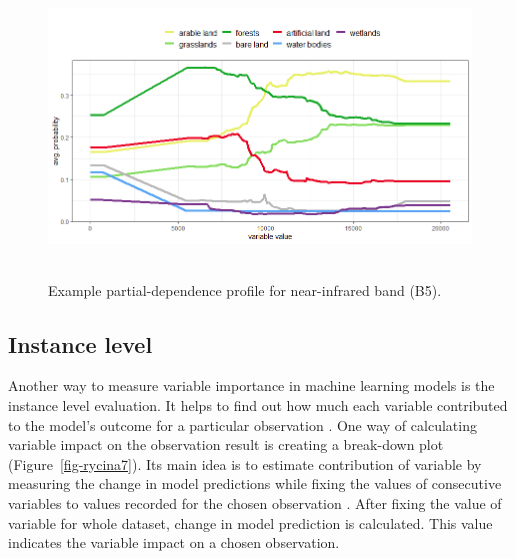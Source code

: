 \documentclass{amuthesis}
\begin{document}
\begin{figure}[H]

{\centering \includegraphics[width=5.625in,height=3.125in]{./figures/profB5.png}

}

\caption{\label{fig-rycina6}Example partial-dependence profile for
near-infrared band (B5).}

\end{figure}

\hypertarget{sec-importance-instance}{%
\subsection{Instance level}\label{sec-importance-instance}}

Another way to measure variable importance in machine learning models is
the instance level evaluation. It helps to find out how much each
variable contributed to the model's outcome for a particular observation
\autocite{biecek_explanatory_2021}. One way of calculating variable
impact on the observation result is creating a break-down plot
(Figure~\ref{fig-rycina7}). Its main idea is to estimate contribution of
variable by measuring the change in model predictions while fixing the
values of consecutive variables to values recorded for the chosen
observation \autocite{biecek_explanatory_2021}. After fixing the value
of variable for whole dataset, change in model prediction is calculated.
This value indicates the variable impact on a chosen observation.
\end{document}
